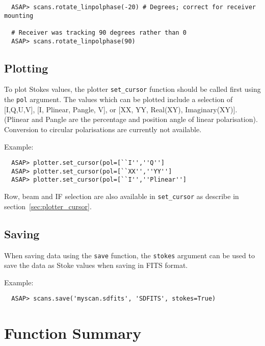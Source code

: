 \documentclass[11pt]{article}
\newcommand{\cmd}[1]{{\tt #1}}
\begin{document}
\begin{verbatim}
  ASAP> scans.rotate_linpolphase(-20) # Degrees; correct for receiver mounting

  # Receiver was tracking 90 degrees rather than 0
  ASAP> scans.rotate_linpolphase(90)  
\end{verbatim}

\subsection{Plotting}
\label{sec:polplot}

To plot Stokes values, the plotter \cmd{set\_cursor} function should
be called first using the \cmd{pol} argument. The values which can be
plotted include a selection of [I,Q,U,V], [I, Plinear, Pangle, V], or
[XX, YY, Real(XY), Imaginary(XY)]. (Plinear and Pangle are the
percentage and position angle of linear polarisation). Conversion to
circular polarisations are currently not available.

Example:

\begin{verbatim}
  ASAP> plotter.set_cursor(pol=[``I'',''Q'']
  ASAP> plotter.set_cursor(pol=[``XX'',''YY'']
  ASAP> plotter.set_cursor(pol=[``I'',''Plinear'']
\end{verbatim}

Row, beam and IF selection are also available in \cmd{set\_cursor} as
describe in section~\ref{sec:plotter_cursor}.

\subsection{Saving}

When saving data using the \cmd{save} function, the \cmd{stokes}
argument can be used to save the data as Stoke values when saving in
FITS format.

Example:

\begin{verbatim}
  ASAP> scans.save('myscan.sdfits', 'SDFITS', stokes=True)
\end{verbatim}

\section{Function Summary}
\end{document}
